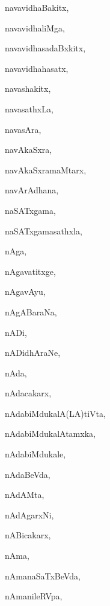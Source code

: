 \begin{multicols}{3}
{\noindent
{navavidhaBakitx}, \pageref{navavidhaBakitx}

\noindent
{navavidhaliMga}, \pageref{navavidhaliMga}

\noindent
{navavidhasadaBxkitx}, \pageref{navavidhasadaBxkitx}

\noindent
{navavidhahasatx}, \pageref{navavidhahasatx}

\noindent
{navashakitx}, \pageref{navashakitx}

\noindent
{navasathxLa}, \pageref{navasathxLa}

\noindent
{navasAra}, \pageref{navasAra}

\noindent
{navAkaSxra}, \pageref{navAkaSxra}

\noindent
{navAkaSxramaMtarx}, \pageref{navAkaSxramaMtarx}

\noindent
{navArAdhana}, \pageref{navArAdhana}

\noindent
{naSATxgama}, \pageref{naSATxgama}

\noindent
{naSATxgamasathxla}, \pageref{naSATxgamasathxla}

\noindent
{nAga}, \pageref{nAga}

\noindent
{nAgavatitxge}, \pageref{nAgavatitxge}

\noindent
{nAgavAyu}, \pageref{nAgavAyu}

\noindent
{nAgABaraNa}, \pageref{nAgABaraNa}

\noindent
{nADi}, \pageref{nADi}

\noindent
{nADidhAraNe}, \pageref{nADidhAraNe}

\noindent
{nAda}, \pageref{nAda}

\noindent
{nAdacakarx}, \pageref{nAdacakarx}

\noindent
{nAdabiMdukalA(LA)tiVta}, \pageref{nAdabiMdukalALAtiVta}

\noindent
{nAdabiMdukalAtamxka}, \pageref{nAdabiMdukalAtamxka}

\noindent
{nAdabiMdukale}, \pageref{nAdabiMdukale}

\noindent
{nAdaBeVda}, \pageref{nAdaBeVda}

\noindent
{nAdAMta}, \pageref{nAdAMta}

\noindent
{nAdAgarxNi}, \pageref{nAdAgarxNi}

\noindent
{nABicakarx}, \pageref{nABicakarx}

\noindent
{nAma}, \pageref{nAma}

\noindent
{nAmanaSaTxBeVda}, \pageref{nAmanaSaTxBeVda}

\noindent
{nAmanileRVpa}, \pageref{nAmanileRVpa}

}
\end{multicols}

